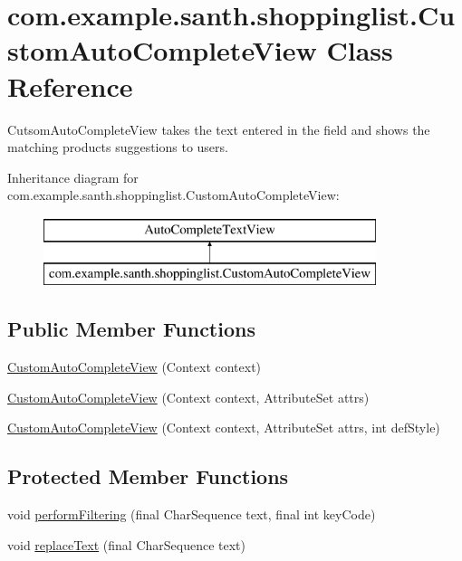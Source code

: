 \hypertarget{classcom_1_1example_1_1santh_1_1shoppinglist_1_1_custom_auto_complete_view}{}\section{com.\+example.\+santh.\+shoppinglist.\+Custom\+Auto\+Complete\+View Class Reference}
\label{classcom_1_1example_1_1santh_1_1shoppinglist_1_1_custom_auto_complete_view}


Cutsom\+Auto\+Complete\+View takes the text entered in the field and shows the matching products suggestions to users.  


Inheritance diagram for com.\+example.\+santh.\+shoppinglist.\+Custom\+Auto\+Complete\+View\+:\begin{figure}[H]
\begin{center}
\leavevmode
\includegraphics[height=2.000000cm]{classcom_1_1example_1_1santh_1_1shoppinglist_1_1_custom_auto_complete_view}
\end{center}
\end{figure}
\subsection*{Public Member Functions}
\begin{DoxyCompactItemize}
\item 
\hyperlink{classcom_1_1example_1_1santh_1_1shoppinglist_1_1_custom_auto_complete_view_aa4dbe321c154d928530b3c08f931e8cd}{Custom\+Auto\+Complete\+View} (Context context)
\item 
\hyperlink{classcom_1_1example_1_1santh_1_1shoppinglist_1_1_custom_auto_complete_view_a9136c0f8789e4085af0d6cad15c3ed6d}{Custom\+Auto\+Complete\+View} (Context context, Attribute\+Set attrs)
\item 
\hyperlink{classcom_1_1example_1_1santh_1_1shoppinglist_1_1_custom_auto_complete_view_a324556a349a08742220c61ab608904fd}{Custom\+Auto\+Complete\+View} (Context context, Attribute\+Set attrs, int def\+Style)
\end{DoxyCompactItemize}
\subsection*{Protected Member Functions}
\begin{DoxyCompactItemize}
\item 
void \hyperlink{classcom_1_1example_1_1santh_1_1shoppinglist_1_1_custom_auto_complete_view_a92656a23380f4872a86ffdebc135ddb0}{perform\+Filtering} (final Char\+Sequence text, final int key\+Code)
\item 
void \hyperlink{classcom_1_1example_1_1santh_1_1shoppinglist_1_1_custom_auto_complete_view_a9a2d10817c0c2db0ea5ca2f3daa2b14e}{replace\+Text} (final Char\+Sequence text)
\end{DoxyCompactItemize}


